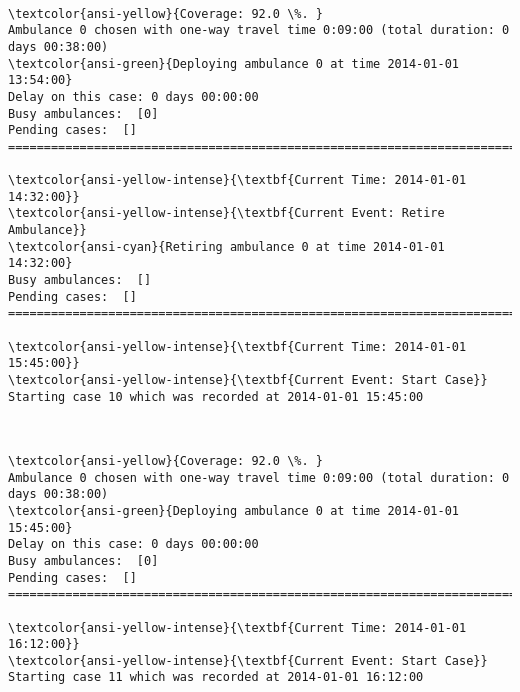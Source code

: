 \documentclass[11pt]{article}
\begin{document}
    \begin{center}
    \end{center}
    { \hspace*{\fill} \\}
    
    \begin{Verbatim}[commandchars=\\\{\}]
\textcolor{ansi-yellow}{Coverage: 92.0 \%. }
Ambulance 0 chosen with one-way travel time 0:09:00 (total duration: 0 days 00:38:00)
\textcolor{ansi-green}{Deploying ambulance 0 at time 2014-01-01 13:54:00}
Delay on this case: 0 days 00:00:00
Busy ambulances:  [0]
Pending cases:  []
========================================================================

\textcolor{ansi-yellow-intense}{\textbf{Current Time: 2014-01-01 14:32:00}}
\textcolor{ansi-yellow-intense}{\textbf{Current Event: Retire Ambulance}}
\textcolor{ansi-cyan}{Retiring ambulance 0 at time 2014-01-01 14:32:00}
Busy ambulances:  []
Pending cases:  []
========================================================================

\textcolor{ansi-yellow-intense}{\textbf{Current Time: 2014-01-01 15:45:00}}
\textcolor{ansi-yellow-intense}{\textbf{Current Event: Start Case}}
Starting case 10 which was recorded at 2014-01-01 15:45:00

    \end{Verbatim}

    \begin{center}
    \end{center}
    { \hspace*{\fill} \\}
    
    \begin{Verbatim}[commandchars=\\\{\}]
\textcolor{ansi-yellow}{Coverage: 92.0 \%. }
Ambulance 0 chosen with one-way travel time 0:09:00 (total duration: 0 days 00:38:00)
\textcolor{ansi-green}{Deploying ambulance 0 at time 2014-01-01 15:45:00}
Delay on this case: 0 days 00:00:00
Busy ambulances:  [0]
Pending cases:  []
========================================================================

\textcolor{ansi-yellow-intense}{\textbf{Current Time: 2014-01-01 16:12:00}}
\textcolor{ansi-yellow-intense}{\textbf{Current Event: Start Case}}
Starting case 11 which was recorded at 2014-01-01 16:12:00

    \end{Verbatim}
\end{document}
